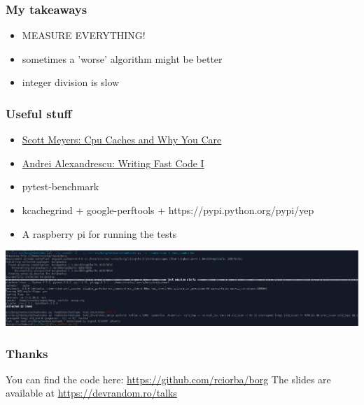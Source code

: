 \documentclass{beamer}
\begin{document}
\begin{frame}
  \frametitle{My takeaways}
  \begin{itemize}
  \item MEASURE EVERYTHING!
  \item sometimes a 'worse' algorithm might be better
  \item integer division is slow
  \end{itemize}
\end{frame}

\begin{frame}
  \frametitle{Useful stuff}
  \begin{itemize}
  \item  \href{https://www.youtube.com/watch?v=WDIkqP4JbkE}{Scott Meyers: Cpu Caches and Why You Care}
  \item  \href{https://www.youtube.com/watch?v=vrfYLlR8X8k}{Andrei Alexandrescu: Writing Fast Code I}
  \item pytest-benchmark
  \item kcachegrind + google-perftools + https://pypi.python.org/pypi/yep
  \item A raspberry pi for running the tests

  \end{itemize}
\end{frame}

\begin{frame}
 \begin{center}
 \includegraphics[scale=0.26,keepaspectratio=true]{./sigabrt.png}
 \end{center}
\end{frame}

\begin{frame}
  \frametitle{Thanks}
  You can find the code here:
  \href{https://github.com/rciorba/borg}{https://github.com/rciorba/borg}
  \newline
  \newline
  The slides are available at
  \href{https://devrandom.ro/talks}{https://devrandom.ro/talks}
\end{frame}
\end{document}
